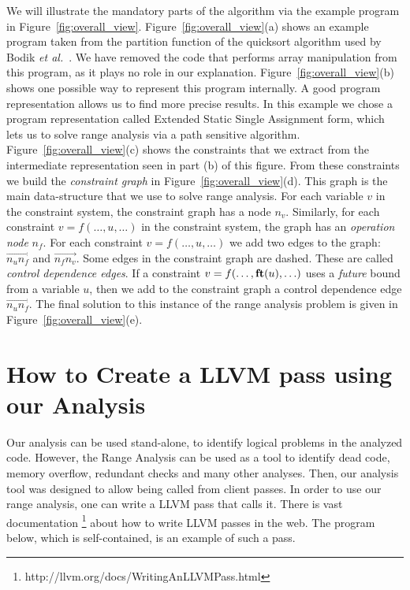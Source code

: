 \documentclass{paper}
\newcommand{\fun}[1]{\mbox{\textbf{#1}}}
\begin{document}
We will illustrate the mandatory parts of the
algorithm via the example program in Figure~\ref{fig:overall_view}.
Figure~\ref{fig:overall_view}(a) shows an example program taken from the
partition function of the quicksort algorithm used by Bodik
{\em et al.}~\cite{Bodik00}.
We have removed the code that performs array manipulation from this program,
as it plays no role in our explanation.
Figure~\ref{fig:overall_view}(b) shows one possible way to represent this
program internally.
A good program representation allows us to find more precise results.
In this example we chose a program representation called
Extended Static Single Assignment form, which lets us to solve range
analysis via a path sensitive algorithm.
Figure~\ref{fig:overall_view}(c) shows the constraints that we extract from
the intermediate representation seen in part (b) of this figure.
From these constraints we build the {\em constraint graph} in
Figure~\ref{fig:overall_view}(d).
This graph is the main data-structure that we use to solve range analysis.
For each variable $v$ in the constraint system, the constraint graph has a node
$n_v$.
Similarly, for each constraint $v = f(\ldots, u, \ldots)$ in the constraint
system, the graph has an {\em operation node} $n_f$.
For each constraint $v = f(\ldots, u, \ldots)$ we add two edges to the
graph: $\overrightarrow{n_un_f}$ and $\overrightarrow{n_fn_v}$.
Some edges in the constraint graph are dashed.
These are called {\em control dependence edges}.
If a constraint $v = f(\ldots, \fun{ft}(u), \ldots)$ uses a {\em future}
bound from a variable $u$, then we add to the constraint graph a control
dependence edge $\overrightarrow{n_un_f}$.
The final solution to this instance of the range analysis problem is
given in Figure~\ref{fig:overall_view}(e).



\section{How to Create a LLVM pass using our Analysis}
\label{sec:howto}

Our analysis can be used stand-alone, to identify logical problems in the analyzed code. However, the Range Analysis can be used as a tool to identify dead code, memory overflow, redundant checks and many other analyses. Then, our analysis tool was designed to allow being called from client passes.
In order to use our range analysis, one can write a LLVM pass that calls it. There is vast documentation \footnote{http://llvm.org/docs/WritingAnLLVMPass.html} about how to write LLVM passes in the web. The program below, which is self-contained, is an example of such a pass.
\end{document}
